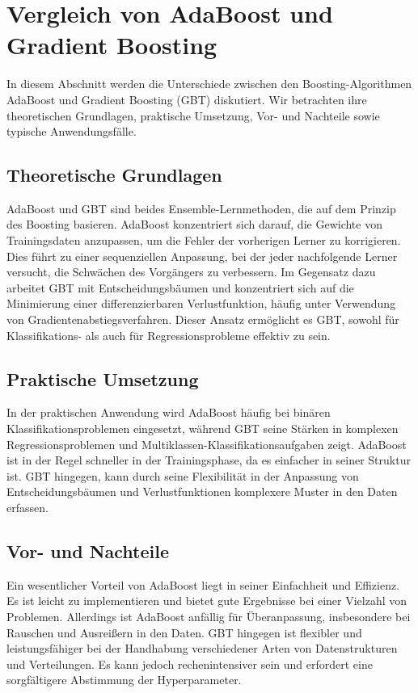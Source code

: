 \section{Vergleich von AdaBoost und Gradient Boosting}
In diesem Abschnitt werden die Unterschiede zwischen den Boosting-Algorithmen AdaBoost und Gradient Boosting (GBT) diskutiert. Wir betrachten ihre theoretischen Grundlagen, praktische Umsetzung, Vor- und Nachteile sowie typische Anwendungsfälle.

\subsection{Theoretische Grundlagen}
AdaBoost und GBT sind beides Ensemble-Lernmethoden, die auf dem Prinzip des Boosting basieren. AdaBoost konzentriert sich darauf, die Gewichte von Trainingsdaten anzupassen, um die Fehler der vorherigen Lerner zu korrigieren. Dies führt zu einer sequenziellen Anpassung, bei der jeder nachfolgende Lerner versucht, die Schwächen des Vorgängers zu verbessern. 
\newline
\newline
Im Gegensatz dazu arbeitet GBT mit Entscheidungsbäumen und konzentriert sich auf die Minimierung einer differenzierbaren Verlustfunktion, häufig unter Verwendung von Gradientenabstiegsverfahren. Dieser Ansatz ermöglicht es GBT, sowohl für Klassifikations- als auch für Regressionsprobleme effektiv zu sein.

\subsection{Praktische Umsetzung}
In der praktischen Anwendung wird AdaBoost häufig bei binären Klassifikationsproblemen eingesetzt, während GBT seine Stärken in komplexen Regressionsproblemen und Multiklassen-Klassifikationsaufgaben zeigt. AdaBoost ist in der Regel schneller in der Trainingsphase, da es einfacher in seiner Struktur ist. GBT hingegen, kann durch seine Flexibilität in der Anpassung von Entscheidungsbäumen und Verlustfunktionen komplexere Muster in den Daten erfassen.

\subsection{Vor- und Nachteile}
Ein wesentlicher Vorteil von AdaBoost liegt in seiner Einfachheit und Effizienz. Es ist leicht zu implementieren und bietet gute Ergebnisse bei einer Vielzahl von Problemen. Allerdings ist AdaBoost anfällig für Überanpassung, insbesondere bei Rauschen und Ausreißern in den Daten.
\newline
\newline
GBT hingegen ist flexibler und leistungsfähiger bei der Handhabung verschiedener Arten von Datenstrukturen und Verteilungen. Es kann jedoch rechenintensiver sein und erfordert eine sorgfältigere Abstimmung der Hyperparameter.

